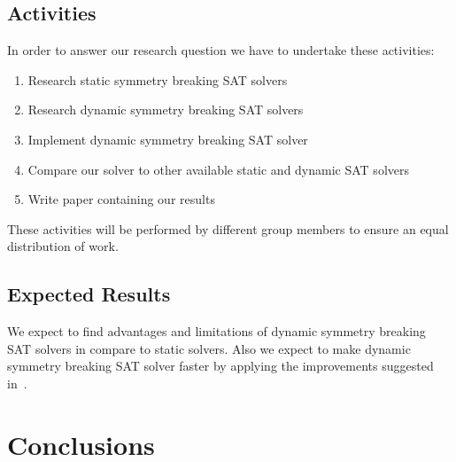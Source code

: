 		\subsection{Activities}
			In order to answer our research question we have to undertake these activities:
	
			\begin{enumerate}
				\item Research static symmetry breaking SAT solvers
				\item Research dynamic symmetry breaking SAT solvers
				\item Implement dynamic symmetry breaking SAT solver
				\item Compare our solver to other available static and dynamic SAT solvers
				\item Write paper containing our results
			\end{enumerate}

			These activities will be performed by different group members to ensure an equal distribution of work.

		\subsection{Expected Results}
			We expect to find advantages and limitations of dynamic symmetry breaking SAT solvers in compare to static solvers.
			Also we expect to make dynamic symmetry breaking SAT solver faster by applying the improvements suggested in~\cite{devriendt2012symmetry}.

	\section{Conclusions}




